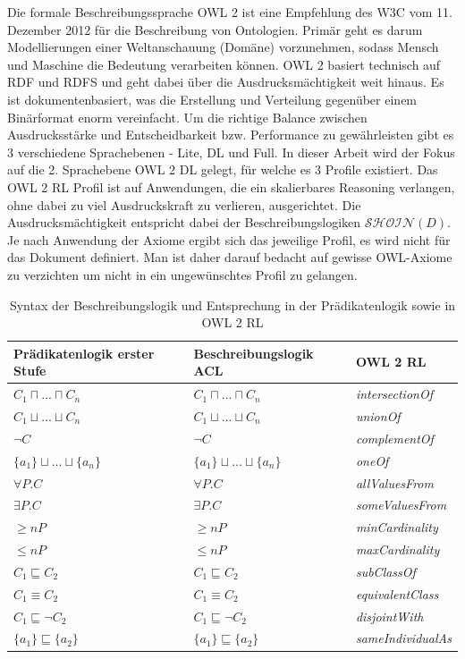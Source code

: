 \documentclass[runningheads,a4paper]{llncs}
\begin{document}
Die formale Beschreibungssprache OWL 2 ist eine Empfehlung des W3C vom 11. Dezember 2012 für die Beschreibung von Ontologien. 
Primär geht es darum Modellierungen einer Weltanschauung (Domäne) vorzunehmen, sodass Mensch und Maschine die Bedeutung verarbeiten können. 
OWL 2 basiert technisch auf RDF und RDFS und geht dabei über die Ausdrucksmächtigkeit weit hinaus. 
Es ist dokumentenbasiert, was die Erstellung und Verteilung gegenüber einem Binärformat enorm vereinfacht. 
Um die richtige Balance zwischen Ausdrucksstärke und Entscheidbarkeit bzw. Performance zu gewährleisten gibt es 3 verschiedene Sprachebenen - Lite, DL und Full. 
In dieser Arbeit wird der Fokus auf die 2. Sprachebene OWL 2 DL gelegt, für welche es 3 Profile existiert. 
Das OWL 2 RL Profil ist auf Anwendungen, die ein skalierbares Reasoning verlangen, ohne dabei zu viel Ausdruckskraft zu verlieren, ausgerichtet. 
Die Ausdrucksmächtigkeit entspricht dabei der Beschreibungslogiken \(\mathcal{SHOIN}(D)\). 
Je nach Anwendung der Axiome ergibt sich das jeweilige Profil, es wird nicht für das Dokument definiert. 
Man ist daher darauf bedacht auf gewisse OWL-Axiome zu verzichten um nicht in ein ungewünschtes Profil zu gelangen.
\begin{table}[h]
\begin{tabular}{|l|l|l|}
\hline
Prädikatenlogik erster Stufe & Beschreibungslogik ACL & OWL 2 RL \\ \hline
$ C_1 \sqcap ... \sqcap C_n $ & $ C_1 \sqcap ... \sqcap C_n $ & \textit{intersectionOf} \\ \hline
$ C_1 \sqcup ... \sqcup C_n $ & $ C_1 \sqcup ... \sqcup C_n $ & \textit{unionOf} \\ \hline
$ \neg C $ & $ \neg C $ & \textit{complementOf} \\ \hline
$ \{a_1\} \sqcup ... \sqcup \{a_n\} $ & $ \{a_1\} \sqcup ... \sqcup \{a_n\} $ & \textit{oneOf} \\ \hline
$ \forall P.C $ & $ \forall P.C $ & \textit{allValuesFrom} \\ \hline
$ \exists P.C $ & $ \exists P.C $ & \textit{someValuesFrom} \\ \hline
$ \geq n P $ & $ \geq n P $ & \textit{minCardinality} \\ \hline
$ \leq n P $ & $ \leq n P $ & \textit{maxCardinality} \\ \hline
$ C_1 \sqsubseteq C_2 $ & $ C_1 \sqsubseteq C_2 $ & \textit{subClassOf} \\ \hline
$ C_1 \equiv C_2 $ & $ C_1 \equiv C_2 $ & \textit{equivalentClass} \\ \hline
$ C_1 \sqsubseteq \neg C_2 $ & $ C_1 \sqsubseteq \neg C_2 $ & \textit{disjointWith} \\ \hline
$ \{a_1\} \sqsubseteq \{a_2\} $ & $ \{a_1\} \sqsubseteq \{a_2\} $ & \textit{sameIndividualAs} \\ \hline
\end{tabular}
\label{table:description_logic}
\caption{Syntax der Beschreibungslogik und Entsprechung in der Prädikatenlogik sowie in OWL 2 RL}
\end{table}
\end{document}
